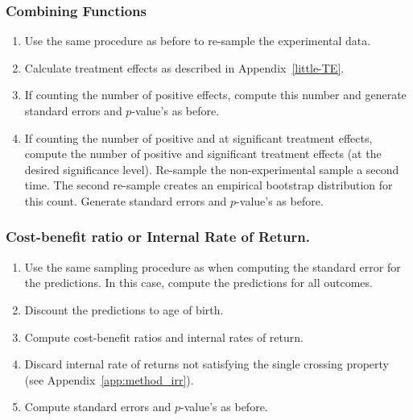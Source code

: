 \subsubsection{Combining Functions}

\begin{enumerate}
\item Use the same procedure as before to re-sample the experimental data.
\item Calculate treatment effects as described in Appendix~\ref{little-TE}.
\item If counting the number of positive effects, compute this number and generate standard errors and $p$-value's as before.
\item If counting the number of positive and at significant treatment effects, compute the number of positive and significant treatment effects (at the desired significance level). Re-sample the non-experimental sample a second time. The second re-sample creates an empirical bootstrap distribution for this count. Generate standard errors and $p$-value's as before.
\end{enumerate}

\subsubsection{Cost-benefit ratio or Internal Rate of Return.}

\begin{enumerate}

\item Use the same sampling procedure as when computing the standard error for the predictions. In this case, compute the predictions for all outcomes.
\item Discount the predictions to age of birth.
\item Compute cost-benefit ratios and internal rates of return.
\item Discard internal rate of returns not satisfying the single crossing property (see Appendix~\ref{app:method_irr}).
\item Compute standard errors and $p$-value's as before.

\end{enumerate} 